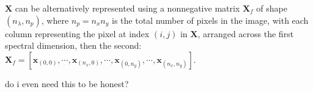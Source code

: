 $\mathbf{X}$ can be alternatively represented using a nonnegative matrix $\mathbf{X}_f$ of shape ${(n_\lambda, n_p)}$, where $n_p = n_x n_y$ is the total number of pixels in the image, with each column representing the pixel at index $(i,j)$ in $\mathbf{X}$, arranged across the first spectral dimension, then the second:  $ \mathbf{X}_f = \left[ \mathbf{x}_{(0,0)},  \cdots, \mathbf{x}_{(n_x,0)}, \cdots, \mathbf{x}_{(0,n_y)}, \cdots, \mathbf{x}_{(n_x, n_y)} \right]$. 

do i even need this to be honest?

